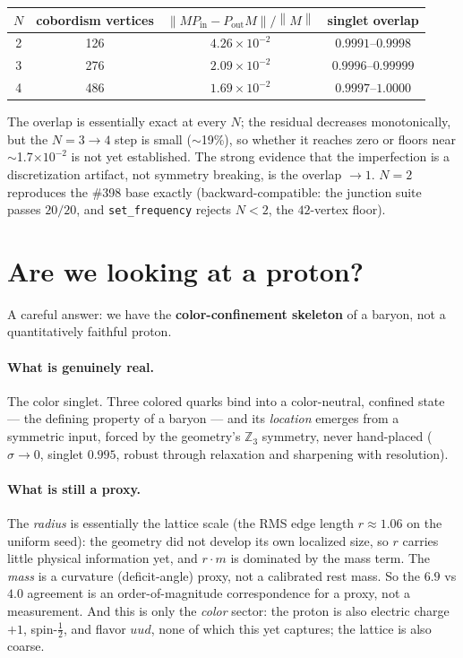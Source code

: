 \documentclass[11pt]{article}
\newcommand{\Z}{\mathbb{Z}}
\newcommand{\norm}[1]{\left\lVert #1 \right\rVert}
\newcommand{\sigmacol}{\sigma}
\newcommand{\Pin}{P_{\mathrm{in}}}
\newcommand{\Pout}{P_{\mathrm{out}}}
\begin{document}
\begin{center}
\setlength{\tabcolsep}{8pt}
\begin{tabular}{@{}cccc@{}}
\toprule
$N$ & cobordism vertices & $\norm{M\Pin-\Pout M}/\norm{M}$ & singlet overlap\\
\midrule
2 & 126 & $4.26\times10^{-2}$ & $0.9991$--$0.9998$\\
3 & 276 & $2.09\times10^{-2}$ & $0.9996$--$0.99999$\\
4 & 486 & $1.69\times10^{-2}$ & $0.9997$--$1.0000$\\
\bottomrule
\end{tabular}
\end{center}

\noindent The overlap is essentially exact at every $N$; the residual decreases
monotonically, but the $N{=}3\to4$ step is small ($\sim$19\%), so whether it reaches
zero or floors near $\sim$1.7$\times10^{-2}$ is not yet established. The strong
evidence that the imperfection is a discretization artifact, not symmetry breaking, is
the overlap $\to 1$. $N=2$ reproduces the \#398 base exactly (backward-compatible: the
junction suite passes $20/20$, and \texttt{set\_frequency} rejects $N<2$, the
$42$-vertex floor).

\section{Are we looking at a proton?}
\label{sec:assess}
A careful answer: we have the \textbf{color-confinement skeleton} of a baryon, not a
quantitatively faithful proton.

\paragraph{What is genuinely real.} The color singlet. Three colored quarks bind into
a color-neutral, confined state --- the defining property of a baryon --- and its
\emph{location} emerges from a symmetric input, forced by the geometry's $\Z_3$
symmetry, never hand-placed ($\sigmacol\to 0$, singlet $0.995$, robust through
relaxation and sharpening with resolution).

\paragraph{What is still a proxy.} The \emph{radius} is essentially the lattice scale
(the RMS edge length $r\approx 1.06$ on the uniform seed): the geometry did not develop
its own localized size, so $r$ carries little physical information yet, and
$r\!\cdot\!m$ is dominated by the mass term. The \emph{mass} is a curvature
(deficit-angle) proxy, not a calibrated rest mass. So the $6.9$ vs $4.0$ agreement is
an order-of-magnitude correspondence for a proxy, not a measurement. And this is only
the \emph{color} sector: the proton is also electric charge $+1$, spin-$\tfrac12$, and
flavor $uud$, none of which this yet captures; the lattice is also coarse.
\end{document}
